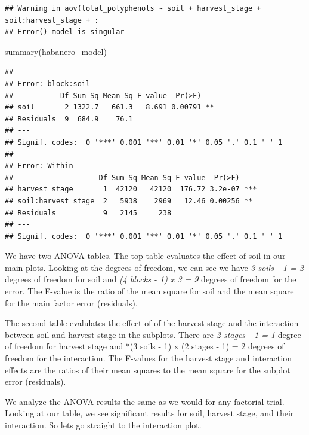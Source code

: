 \documentclass[
]{book}
\newenvironment{Shaded}{\begin{snugshade}}{\end{snugshade}}
\newcommand{\FunctionTok}[1]{\textcolor[rgb]{0.00,0.00,0.00}{#1}}
\newcommand{\NormalTok}[1]{#1}
\begin{document}
\begin{verbatim}
## Warning in aov(total_polyphenols ~ soil + harvest_stage + soil:harvest_stage + :
## Error() model is singular
\end{verbatim}

\begin{Shaded}
\begin{Highlighting}[]
\FunctionTok{summary}\NormalTok{(habanero\_model)}
\end{Highlighting}
\end{Shaded}

\begin{verbatim}
## 
## Error: block:soil
##           Df Sum Sq Mean Sq F value  Pr(>F)   
## soil       2 1322.7   661.3   8.691 0.00791 **
## Residuals  9  684.9    76.1                   
## ---
## Signif. codes:  0 '***' 0.001 '**' 0.01 '*' 0.05 '.' 0.1 ' ' 1
## 
## Error: Within
##                    Df Sum Sq Mean Sq F value  Pr(>F)    
## harvest_stage       1  42120   42120  176.72 3.2e-07 ***
## soil:harvest_stage  2   5938    2969   12.46 0.00256 ** 
## Residuals           9   2145     238                    
## ---
## Signif. codes:  0 '***' 0.001 '**' 0.01 '*' 0.05 '.' 0.1 ' ' 1
\end{verbatim}

We have two ANOVA tables. The top table evaluates the effect of soil in our main plots. Looking at the degrees of freedom, we can see we have \emph{3 soils - 1 = 2} degrees of freedom for soil and \emph{(4 blocks - 1) x 3 = 9} degrees of freedom for the error. The F-value is the ratio of the mean square for soil and the mean square for the main factor error (residuals).

The second table evalulates the effect of of the harvest stage and the interaction between soil and harvest stage in the subplots. There are \emph{2 stages - 1 = 1} degree of freedom for harvest stage and *(3 soils - 1) x (2 stages - 1) = 2 degrees of freedom for the interaction. The F-values for the harvest stage and interaction effects are the ratios of their mean squares to the mean square for the subplot error (residuals).

We analyze the ANOVA results the same as we would for any factorial trial. Looking at our table, we see significant results for soil, harvest stage, and their interaction. So lets go straight to the interaction plot.
\end{document}
